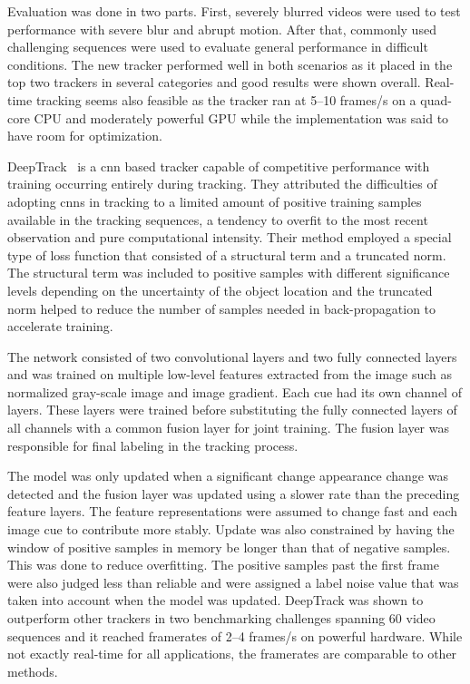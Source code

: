 Evaluation was done in two parts. First, severely blurred videos were used to test
performance with severe blur and abrupt motion. After that, commonly used challenging
sequences were used to evaluate general performance in difficult conditions. The new
tracker performed well in both scenarios as it placed in the top two trackers in several
categories and good results were shown overall. Real-time tracking seems also feasible
as the tracker ran at 5--10 frames/s on a quad-core CPU and moderately powerful GPU while
the implementation was said to have room for optimization.

DeepTrack~\cite{DEEPTRACK} is a \ac{cnn} based tracker capable of competitive performance
with training occurring entirely during tracking. They attributed the difficulties of
adopting \ac{cnn}s in tracking to a limited amount of positive training samples available
in the tracking sequences, a tendency to overfit to the most recent observation and pure
computational intensity. Their method employed a special type of loss function that
consisted of a structural term and a truncated norm. The structural term was included
to positive samples with different significance levels depending on the uncertainty of
the object location and the truncated norm helped to reduce the number of samples needed
in back-propagation to accelerate training.

The network consisted of two convolutional layers and two fully connected layers and
was trained on multiple low-level features extracted from the image such as normalized
gray-scale image and image gradient. Each cue had its own channel of layers. These
layers were trained before substituting the fully connected layers of all channels
with a common fusion layer for joint training. The fusion layer was responsible for
final labeling in the tracking process.

The model was only updated when a significant change appearance change was detected
and the fusion layer was updated using a slower rate than the preceding feature layers.
The feature representations were assumed to change fast and each image cue to contribute
more stably. Update was also constrained by having the window of positive samples in
memory be longer than that of negative samples. This was done to reduce overfitting.
The positive samples past the first frame were also judged less than reliable and
were assigned a label noise value that was taken into account when the model was updated.
DeepTrack was shown to outperform other trackers in two benchmarking challenges
spanning 60 video sequences and it reached framerates of 2--4 frames/s on powerful
hardware. While not exactly real-time for all applications, the framerates are comparable
to other methods.

